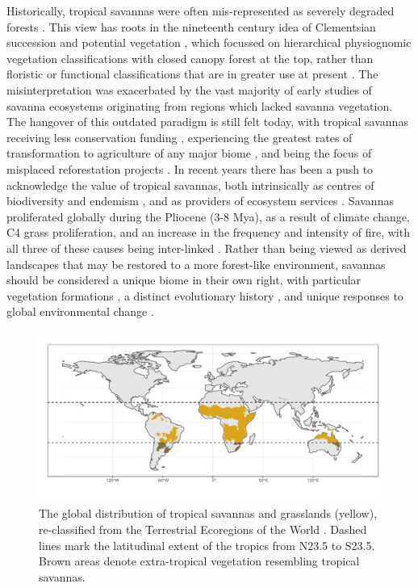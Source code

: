 \begin{refsection}
Historically, tropical savannas were often mis-represented as severely degraded forests \citep{Veldman2016}. This view has roots in the nineteenth century idea of Clementsian succession and potential vegetation \citep{Pulsford2014}, which focussed on hierarchical physiognomic vegetation classifications with closed canopy forest at the top, rather than floristic or functional classifications that are in greater use at present \citep{Aleman2020}. The misinterpretation was exacerbated by the vast majority of early studies of savanna ecosystems originating from regions which lacked savanna vegetation. The hangover of this outdated paradigm is still felt today, with tropical savannas receiving less conservation funding \citep{Watson2016}, experiencing the greatest rates of transformation to agriculture of any major biome \citep{Hoekstra2004, Parr2014}, and being the focus of misplaced reforestation projects \citep{Silveira2020, Kumar2020, Laestadius2011}. In recent years there has been a push to acknowledge the value of tropical savannas, both intrinsically as centres of biodiversity and endemism \citep{Kumar2020, Pennington2018}, and as providers of ecosystem services \citep{Ryan2016}. Savannas proliferated globally during the Pliocene (\textapprox{}3-8 Mya), as a result of climate change, C4 grass proliferation, and an increase in the frequency and intensity of fire, with all three of these causes being inter-linked \citep{Cerling1997, Beerling2006, Edwards2010}. Rather than being viewed as derived landscapes that may be restored to a more forest-like environment, savannas should be considered a unique biome in their own right, with particular vegetation formations \citep{Torello2013}, a distinct evolutionary history \citep{Veldman2015}, and unique responses to global environmental change \citep{}.

\begin{figure}[!h]
\centering
	\includegraphics[width=\textwidth]{img/savanna_map}
	\caption[Map of global savanna distribution]{The global distribution of tropical savannas and grasslands (yellow), re-classified from the Terrestrial Ecoregions of the World \citep{Dinerstein2017}. Dashed lines mark the latitudinal extent of the tropics from N23.5\textdegree{} to S23.5\textdegree{}. Brown areas denote extra-tropical vegetation resembling tropical savannas.}
	\label{background:savanna_map}
\end{figure}


\end{refsection}
